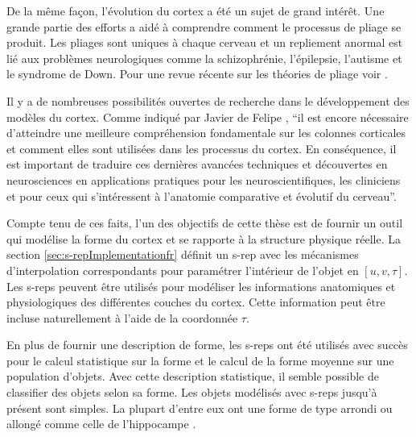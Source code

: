 De la même façon, l'évolution du cortex a été un sujet de grand intérêt.
Une grande partie des efforts a aidé à comprendre comment le processus de pliage se produit.
Les pliages sont uniques à chaque cerveau et un repliement anormal est lié aux problèmes 
neurologiques comme la schizophrénie, l'épilepsie, l'autisme et le syndrome de Down.
Pour une revue récente sur les théories de pliage voir \cite{filas2013mechanisms}.

Il y a de nombreuses possibilités ouvertes de recherche dans le développement des modèles du cortex.
Comme indiqué par Javier de Felipe \cite{defelipe2012neocortical}, 
``il est encore nécessaire d'atteindre une meilleure compréhension fondamentale sur les colonnes corticales et 
comment elles sont utilisées dans les processus du cortex. En conséquence, il est important de traduire 
ces dernières avancées techniques et découvertes en neurosciences en applications pratiques pour les neuroscientifiques, 
les cliniciens et pour ceux qui s'intéressent à l'anatomie comparative et évolutif du cerveau''.

Compte tenu de ces faits, l'un des objectifs de cette thèse est de fournir un outil qui modélise la forme du cortex et se rapporte à la structure physique réelle.
La section \ref{sec:s-repImplementationfr} définit un s-rep avec les mécanismes d'interpolation correspondants pour paramétrer l'intérieur de l'objet en $[u, v, \tau]$.
Les s-reps peuvent être utilisés pour modéliser les informations anatomiques et physiologiques des différentes couches du cortex.
Cette information peut être incluse naturellement à l'aide de la coordonnée $\tau$.

En plus de fournir une description de forme, les s-reps ont été utilisés avec succès pour le calcul statistique sur la forme et le calcul de la forme moyenne sur une population d'objets.
Avec cette description statistique, il semble possible de classifier des objets selon sa forme.
Les objets modélisés avec s-reps jusqu'à présent sont simples. La plupart d'entre eux ont une
forme de type arrondi ou allongé comme celle de l'hippocampe \cite{pizer_nested_2012}.

